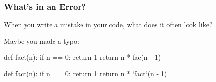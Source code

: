 \documentclass[aspectratio=169, handout]{beamer}
\newcommand{\cmark}{{\color{green!80!black}\ding{51}}}
\newcommand{\xmark}{{\color{red}\ding{55}}}
\begin{document}
\begin{frame}[fragile]
  \frametitle{What's in an Error?}

  When you write a mistake in your code, what does it often look like?

  \pause
  \vspace{\fill}

  Maybe you made a typo:

  \begin{center}
    \begin{minipage}[t][1.0in][t]{\textwidth}
      \begin{minipage}{0.2\textwidth}
        \centering
        \vspace{\fill}
        {\huge\xmark}
        \vspace{\fill}
      \end{minipage}
      \vspace{\fill}
      \begin{minipage}{0.75\textwidth}
        {\small
        \begin{codeblock}[rulecolor=\color{red}, framerule=0.3mm, language=python]
          def fact(n):
            if n == 0:
              return 1
            return n * fac(n - 1)
        \end{codeblock}
        }
      \end{minipage}
    \end{minipage}
    \pause
    \begin{minipage}[t][1.0in][t]{\textwidth}
      \begin{minipage}{0.2\textwidth}
        \centering
        \vspace{\fill}
        {\huge\cmark}
        \vspace{\fill}
      \end{minipage}
      \vspace{\fill}
      \begin{minipage}{0.75\textwidth}
        {\small
        \begin{codeblock}[rulecolor=\color{green!80!black}, framerule=0.3mm, language=python]
          def fact(n):
            if n == 0:
              return 1
            return n * `fact`(n - 1)
        \end{codeblock}
        }
      \end{minipage}
    \end{minipage}
  \end{center}
\end{frame}
\end{document}
